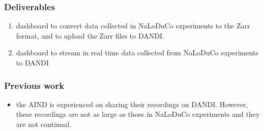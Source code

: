 
\begin{frame}
    \frametitle{Deliverables}

    \begin{enumerate}

        \item dashboard to convert data collected in NaLoDuCo experiments to the Zarr format, and to upload the Zarr files to DANDI.

        \item dashboard to stream in real time data collected from NaLoDuCo experiments to DANDI

\end{enumerate}

\end{frame}

\begin{frame}
    \frametitle{Previous work}

    \begin{itemize}

        \item the AIND is experienced on sharing their recordings on DANDI.
        However, these recordings are not as large as those in NaLoDuCo
        experiments and they are not continual.

\end{itemize}

\end{frame}

